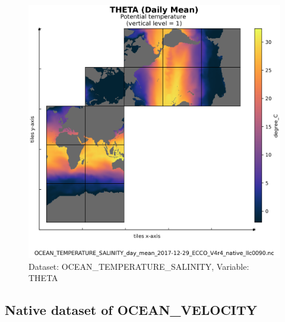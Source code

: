 \begin{figure}[H]
\centering
\includegraphics[scale=0.55]{../images/plots/v4r4/native_plots/Ocean_Temperature_and_Salinity/THETA.png}
\caption{Dataset: OCEAN\_TEMPERATURE\_SALINITY, Variable: THETA}
\label{tab:table-OCEAN_TEMPERATURE_SALINITY_THETA-Plot}
\end{figure}
\newpage
\subsection{Native dataset of OCEAN\_VELOCITY}
\newp
